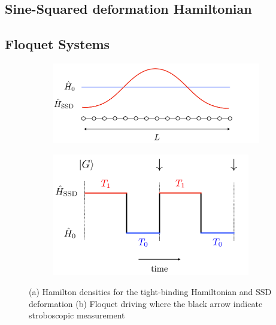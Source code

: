 \documentclass[11pt, a4paper]{article}
\theoremstyle{definition} %
\begin{document}
\subsection{Sine-Squared deformation Hamiltonian}


\subsection{Floquet Systems}


\begin{figure}[h]
\centering
		\begin{subfigure}[b]{0.45\textwidth}
			\includegraphics[width=\textwidth]{Floquet_Drive1D_Deformation.pdf}
			\caption{}
		\end{subfigure}
		\begin{subfigure}[b]{0.45\textwidth}
			\includegraphics[width=0.95\textwidth]{Floquet_Drive.pdf}
			\caption{}
		\end{subfigure}
		\caption{(a) Hamilton densities for the tight-binding Hamiltonian and SSD deformation (b) Floquet driving where the black arrow indicate stroboscopic measurement}
\end{figure}
\end{document}
